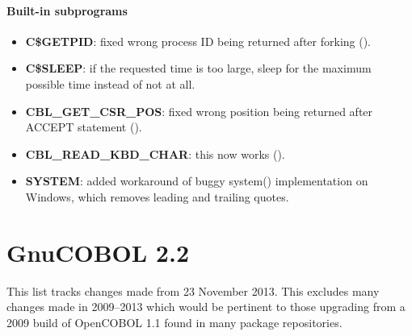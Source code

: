\paragraph{Built-in subprograms}
\begin{itemize}
\item \textbf{C\$GETPID}: fixed wrong process ID being returned after forking ().
\item \textbf{C\$SLEEP}: if the requested time is too large, sleep for the maximum possible time instead of not at all.
\item \textbf{CBL\_GET\_CSR\_POS}: fixed wrong position being returned after ACCEPT statement ().
\item \textbf{CBL\_READ\_KBD\_CHAR}: this now works ().
\item \textbf{SYSTEM}: added workaround of buggy system() implementation on Windows, which removes leading and trailing quotes.
\end{itemize}

\section{GnuCOBOL 2.2}

This list tracks changes made from 23 November 2013. This excludes many changes made in 2009--2013 which would be pertinent to those upgrading from a 2009 build of OpenCOBOL 1.1 found in many package repositories.

